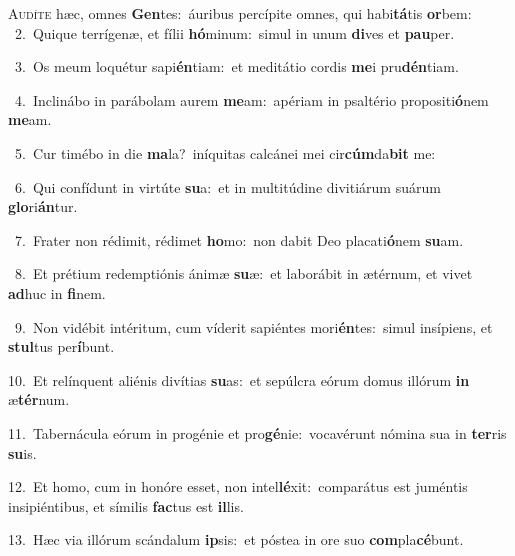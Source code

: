 \lettrine{\initial\textcolor{\initialcolor}{A}}{udíte} hæc, omnes \textbf{Gen}\-tes:~\star áuribus percípite omnes, qui habi\-\textbf{tá}\-tis \textbf{or}\-bem:\\
{\numbfont\textcolor{\numbcolor}{~2.}}~Quique terrígenæ, et fílii \textbf{hó}\-minum:~\star simul in unum \textbf{di}\-ves et \textbf{pau}\-per.\par
{\numbfont\textcolor{\numbcolor}{~3.}}~Os meum loquétur sapi\-\textbf{én}\-tiam:~\star et meditátio cordis \textbf{me}\-i pru\-\textbf{dén}\-tiam.\par
{\numbfont\textcolor{\numbcolor}{~4.}}~Inclinábo in parábolam aurem \textbf{me}\-am:~\star apériam in psaltério propositi\-\textbf{ó}\-nem \textbf{me}\-am.\par
{\numbfont\textcolor{\numbcolor}{~5.}}~Cur timébo in die \textbf{ma}\-la?~\star iníquitas calcánei mei cir\-\textbf{cúm}\-da\textbf{bit} me:\par
{\numbfont\textcolor{\numbcolor}{~6.}}~Qui confídunt in virtúte \textbf{su}\-a:~\star et in multitúdine divitiárum suárum \textbf{glo}\-ri\-\textbf{án}\-tur.\par
{\numbfont\textcolor{\numbcolor}{~7.}}~Frater non rédimit, rédimet \textbf{ho}\-mo:~\star non dabit Deo placati\-\textbf{ó}\-nem \textbf{su}\-am.\par
{\numbfont\textcolor{\numbcolor}{~8.}}~Et prétium redemptiónis ánimæ \textbf{su}\-æ:~\star et laborábit in ætérnum, et vivet \textbf{ad}\-huc in \textbf{fi}\-nem.\par
{\numbfont\textcolor{\numbcolor}{~9.}}~Non vidébit intéritum, cum víderit sapiéntes mori\-\textbf{én}\-tes:~\star simul insípiens, et \textbf{stul}\-tus per\-\textbf{í}\-bunt.\par
{\numbfont\textcolor{\numbcolor}{10.}}~Et relínquent aliénis divítias \textbf{su}\-as:~\star et sepúlcra eórum domus illórum \textbf{in} æ\-\textbf{tér}\-num.\par
{\numbfont\textcolor{\numbcolor}{11.}}~Tabernácula eórum in progénie et pro\-\textbf{gé}\-nie:~\star vocavérunt nómina sua in \textbf{ter}\-ris \textbf{su}\-is.\par
{\numbfont\textcolor{\numbcolor}{12.}}~Et homo, cum in honóre esset, non intel\-\textbf{lé}\-xit:~\star comparátus est juméntis insipiéntibus, et símilis \textbf{fac}\-tus est \textbf{il}\-lis.\par
{\numbfont\textcolor{\numbcolor}{13.}}~Hæc via illórum scándalum \textbf{ip}\-sis:~\star et póstea in ore suo \textbf{com}\-pla\-\textbf{cé}\-bunt.\par
